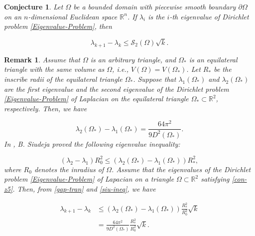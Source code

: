 \documentclass[12pt]{article}
\newtheorem{con}[thm]{Conjecture}
\newtheorem{rem}[thm]{Remark}
\numberwithin{equation}{section}
\begin{document}
\begin{con}\label{conj-z2}
Let $\Omega$ be a bounded domain with piecewise smooth boundary $\partial\Omega$ on an $n$-dimensional Euclidean space
$\mathbb{R}^{n}$. If $\lambda_{i}$ is the $i$-th eigenvalue of Dirichlet problem \eqref{Eigenvalue-Problem}, then


\begin{equation}\label{con-z5}\lambda_{k+1}-\lambda_{k}\leq\mathcal{S}_{2}(\Omega)\sqrt{k}.
\end{equation}
\end{con}

\begin{rem}
Assume that $\Omega$ is an arbitrary triangle, and $ \Omega_{\ast} $ is an equilateral triangle with the same volume as $\Omega$, i.e., $V(\Omega)=V(\Omega_{\ast})$.
Let $R_{\ast}$ be the inscribe radii of the equilateral triangle $\Omega_{\ast}$. Suppose that $\lambda_{1}(\Omega_{\ast})$ and $\lambda_{2}(\Omega_{\ast})$
are the first eigenvalue and the second eigenvalue of the Dirichlet problem \eqref{Eigenvalue-Problem} of Laplacian on the equilateral
triangle $\Omega_{\ast}\subset\mathbb{R}^{2}$, respectively. Then,
we have


\begin{equation}\label{gap-tran}\lambda_{2}(\Omega_{\ast})-\lambda_{1}(\Omega_{\ast})=\frac{64\pi^{2}}{9D^{2}(\Omega_{\ast})}.\end{equation}
In {\rm\cite{Siu2}}, B. Siudeja proved the following eigenvalue inequality:

\begin{equation}\label{siu-ineq} (\lambda_{2}-\lambda_{1})R^{2}_{0}\leq(\lambda_{2}(\Omega_{\ast})-\lambda_{1}(\Omega_{\ast}))R_{\ast}^{2},\end{equation}where $R_{0}$ denotes
the inradius of $\Omega$. Assume that the eigenvalues of the Dirichlet problem \eqref{Eigenvalue-Problem} of Lapacian on a
triangle $\Omega\subset\mathbb{R}^{2}$ satisfying \eqref{con-z5}.
Then, from \eqref{gap-tran} and \eqref{siu-ineq}, we have

\end{rem}
\begin{equation}\begin{aligned}  \lambda_{k+1}-\lambda_{k}&\leq(\lambda_{2}(\Omega_{\ast})-\lambda_{1}(\Omega_{\ast}))\frac{R_{\ast}^{2}}{R^{2}_{0}}\sqrt{k}
\\&=\frac{64\pi^{2}}{9D^{2}(\Omega_{\ast})}\frac{R_{\ast}^{2}}{R^{2}_{0}}\sqrt{k}.\end{aligned}\end{equation}
\end{document}
